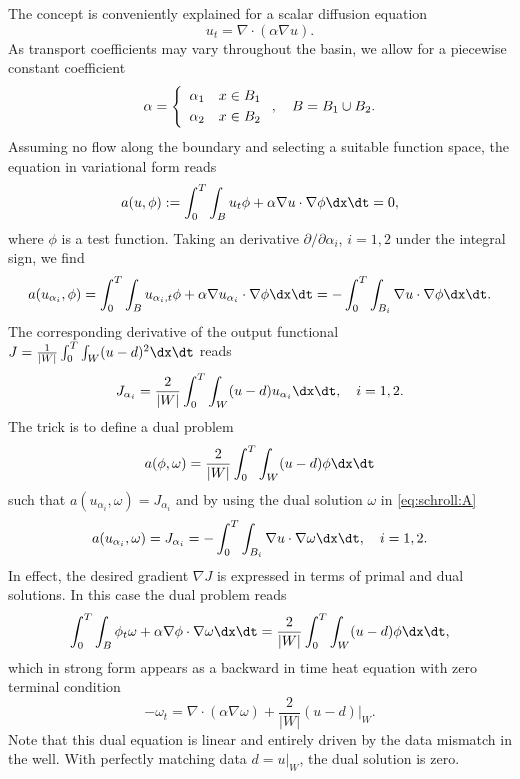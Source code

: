 The concept is conveniently explained for a scalar diffusion equation
\begin{equation}
 u_t = \nabla \cdot (\alpha \nabla u) .
\end{equation}
As transport coefficients may vary throughout the basin,
we allow for a piecewise constant coefficient
\begin{equation}
 \alpha = \left\{
 \begin{array}{rl} \alpha_1 & x \in B_1 \\[\jot] \alpha_2 & x \in B_2 \end{array}
 \right., \quad B = B_1 \cup B_2
 .
\end{equation}
Assuming no flow along the boundary and selecting a suitable function
space, the equation in variational form reads
\begin{equation}
  a(u, \phi) := \int_0^T \int_B u_t \phi + \alpha \nabla u \cdot \nabla \phi \dx \dt = 0,
\end{equation}
where $\phi$ is a test function.  Taking an derivative $\partial /\partial
\alpha_i$, $i=1,2$ under the integral sign, we find
\begin{equation} \label{eq:schroll:A}
 a(u_{\alpha_i}, \phi) =
 \int_0^T \int_B u_{\alpha_i,t} \phi + \alpha \nabla u_{\alpha_i} \cdot \nabla \phi \dx \dt =
 - \int_0^T \int_{B_i} \nabla u \cdot \nabla \phi \dx \dt
 .
\end{equation}
The corresponding derivative of the output functional
$J=\frac{1}{|W|}\int_0^T \int_W (u-d)^2 \dx\dt$
reads
\begin{equation}
 J_{\alpha_i} = \frac{2}{|W|} \int_0^T \int_W (u - d) u_{\alpha_i} \dx\dt, \quad i=1,2 .
\end{equation}
The trick is to define a dual problem
\begin{equation}
 a(\phi, \omega) = \frac{2}{|W|} \int_0^T \int_W (u - d) \phi \dx\dt
\end{equation}
such that $a(u_{\alpha_i}, \omega) = J_{\alpha_i}$ and by using the dual
solution $\omega$ in \eqref{eq:schroll:A}
\begin{equation}
 a(u_{\alpha_i}, \omega) =  J_{\alpha_i} = - \int_0^T \int_{B_i} \nabla u \cdot \nabla \omega \dx \dt,
 \quad i=1,2 .
\end{equation}
In effect, the desired gradient $\nabla J$ is expressed in terms of
primal and dual solutions. In this case the dual problem reads
\begin{equation} \label{eq:schroll:dual}
 \int_0^T \int_B \phi_t \omega + \alpha \nabla \phi \cdot \nabla \omega \dx \dt =
 \frac{2}{|W|} \int_0^T \int_W (u-d) \phi \dx \dt,
\end{equation}
which in strong form appears as a backward in time heat equation with
zero terminal condition
\begin{equation}
 - \omega_t = \nabla \cdot (\alpha \nabla \omega) + \frac{2}{|W|} (u-d)|_W .
\end{equation}
Note that this dual equation is linear and entirely driven by the data
mismatch in the well.  With perfectly matching data $d=u|_W$, the dual
solution is zero.

